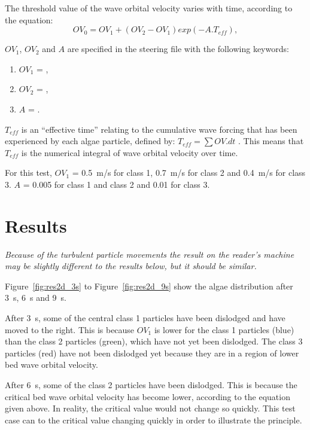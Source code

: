 \smallskip
The threshold value of the wave orbital velocity varies with time, according to
the equation:
\begin{equation}
OV_0 = OV_1 + (OV_2 - OV_1) exp(-A . T_{eff}),
\end{equation}

$OV_1$, $OV_2$ and $A$ are specified in the steering file with the following
keywords:

\begin{enumerate}
\item[\nonumber] $OV_{1}$ = ,
\item[\nonumber] $OV_{2}$ = ,
\item[\nonumber] $A$ = .
\end{enumerate}
$T_{eff}$ is an “effective time” relating to the cumulative wave forcing that
has been experienced by each algae particle, defined by: $T_{eff} = \sum { OV . dt}$ .
This means that $T_{eff}$ is the numerical integral of wave orbital velocity over time.

\smallskip
For this test, $OV_1$ = 0.5~m/s for class 1, 0.7~m/s for class 2 and 0.4~m/s for class 3.
$A$ = 0.005 for class 1 and class 2 and 0.01 for class 3.

\section{Results}

\emph{Because of the turbulent particle movements the result on the reader's
  machine may be slightly different to the results below, but it should be similar.}

\smallskip
Figure~\ref{fig:res2d_3s} to Figure~\ref{fig:res2d_9s} show the algae distribution
after 3~s, 6~s and 9~s.

\smallskip
After 3~s, some of the central class 1 particles have been dislodged and
have moved to the right.
This is because $OV_1$ is lower for the class 1 particles (blue) than the class
2 particles (green), which have not yet been dislodged.
The class 3 particles (red) have not been dislodged yet because they are in a
region of lower bed wave orbital velocity.

\smallskip
After 6~s, some of the class 2 particles have been dislodged.
This is because the critical bed wave orbital velocity has become lower,
according to the equation given above.
In reality, the critical value would not change so quickly.
This test case can to the critical value changing quickly in order to illustrate
the principle.

